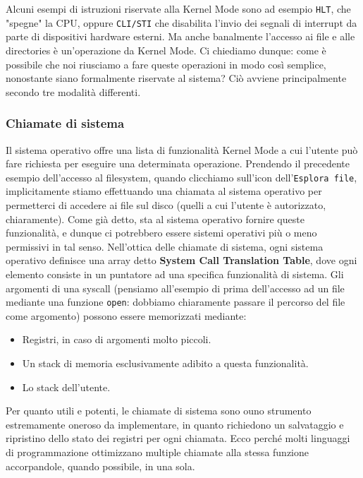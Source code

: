 \documentclass[12pt]{report}
\begin{document}
	Alcuni esempi di istruzioni riservate alla Kernel Mode sono ad esempio \texttt{HLT}, che "spegne" la CPU, oppure \texttt{CLI/STI} che disabilita l'invio dei segnali di interrupt da parte di dispositivi hardware esterni. Ma anche banalmente l'accesso ai file e alle directories è un'operazione da Kernel Mode.
	Ci chiediamo dunque: come è possibile che noi riusciamo a fare queste operazioni in modo così semplice, nonostante siano formalmente riservate al sistema?
	\smallbreak
	Ciò avviene principalmente secondo tre modalità differenti.
	
	\subsubsection{Chiamate di sistema}
	Il sistema operativo offre una lista di funzionalità Kernel Mode a cui l'utente può fare richiesta per eseguire una determinata operazione. Prendendo il precedente esempio dell'accesso al filesystem, quando clicchiamo sull'icon dell'\texttt{Esplora file}, implicitamente stiamo effettuando una chiamata al sistema operativo per permetterci di accedere ai file sul disco (quelli a cui l'utente è autorizzato, chiaramente).
	Come già detto, sta al sistema operativo fornire queste funzionalità, e dunque ci potrebbero essere sistemi operativi più o meno permissivi in tal senso.
	\smallbreak
	Nell'ottica delle chiamate di sistema, ogni sistema operativo definisce una array detto \textbf{System Call Translation Table}, dove ogni elemento consiste in un puntatore ad una specifica funzionalità di sistema.
	\smallbreak
	Gli argomenti di una syscall (pensiamo all'esempio di prima dell'accesso ad un file mediante una funzione \texttt{open}: dobbiamo chiaramente passare il percorso del file come argomento) possono essere memorizzati mediante:
	\begin{itemize}
		\item Registri, in caso di argomenti molto piccoli.
		\item Un stack di memoria esclusivamente adibito a questa funzionalità.
		\item Lo stack dell'utente.
	\end{itemize}
	Per quanto utili e potenti, le chiamate di sistema sono ouno strumento estremamente oneroso da implementare, in quanto richiedono un salvataggio e ripristino dello stato dei registri per ogni chiamata. Ecco perché molti linguaggi di programmazione ottimizzano multiple chiamate alla stessa funzione accorpandole, quando possibile, in una sola.
	
\end{document}
